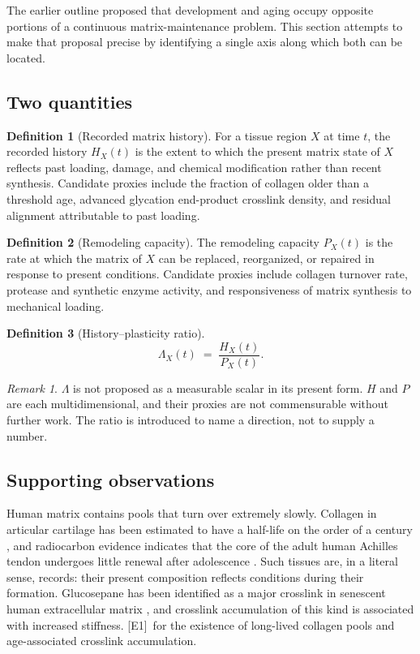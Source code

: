 \documentclass[11pt,a4paper]{article}
\theoremstyle{plain}
\theoremstyle{definition}
\newtheorem{definition}{Definition}[section]
\theoremstyle{remark}
\newtheorem{remark}{Remark}[section]
\newcommand{\tier}[1]{\textup{\textsc{[#1]}}}
\newcommand{\Eone}{\tier{E1}}
\begin{document}
The earlier outline proposed that development and aging occupy opposite portions of a continuous matrix-maintenance problem. This section attempts to make that proposal precise by identifying a single axis along which both can be located.

\subsection{Two quantities}

\begin{definition}[Recorded matrix history]
For a tissue region $X$ at time $t$, the recorded history $H_X(t)$ is the extent to which the present matrix state of $X$ reflects past loading, damage, and chemical modification rather than recent synthesis. Candidate proxies include the fraction of collagen older than a threshold age, advanced glycation end-product crosslink density, and residual alignment attributable to past loading.
\end{definition}

\begin{definition}[Remodeling capacity]
The remodeling capacity $P_X(t)$ is the rate at which the matrix of $X$ can be replaced, reorganized, or repaired in response to present conditions. Candidate proxies include collagen turnover rate, protease and synthetic enzyme activity, and responsiveness of matrix synthesis to mechanical loading.
\end{definition}

\begin{definition}[History--plasticity ratio]
\[
\Lambda_X(t) \;=\; \frac{H_X(t)}{P_X(t)}.
\]
\end{definition}

\begin{remark}
$\Lambda$ is not proposed as a measurable scalar in its present form. $H$ and $P$ are each multidimensional, and their proxies are not commensurable without further work. The ratio is introduced to name a direction, not to supply a number.
\end{remark}

\subsection{Supporting observations}

Human matrix contains pools that turn over extremely slowly. Collagen in articular cartilage has been estimated to have a half-life on the order of a century \cite{verzijl2000}, and radiocarbon evidence indicates that the core of the adult human Achilles tendon undergoes little renewal after adolescence \cite{heinemeier2013}. Such tissues are, in a literal sense, records: their present composition reflects conditions during their formation. Glucosepane has been identified as a major crosslink in senescent human extracellular matrix \cite{sell2005}, and crosslink accumulation of this kind is associated with increased stiffness. \Eone\ for the existence of long-lived collagen pools and age-associated crosslink accumulation.
\end{document}
